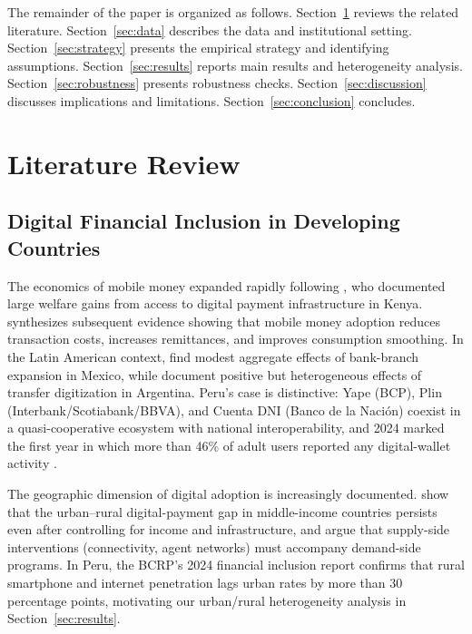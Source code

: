 \documentclass[12pt]{article}
\begin{document}
The remainder of the paper is organized as follows.
Section~\ref{sec:literature} reviews the related literature.
Section~\ref{sec:data} describes the data and institutional setting.
Section~\ref{sec:strategy} presents the empirical strategy and identifying
assumptions.
Section~\ref{sec:results} reports main results and heterogeneity analysis.
Section~\ref{sec:robustness} presents robustness checks.
Section~\ref{sec:discussion} discusses implications and limitations.
Section~\ref{sec:conclusion} concludes.


\section{Literature Review}
\label{sec:literature}

\subsection{Digital Financial Inclusion in Developing Countries}

The economics of mobile money expanded rapidly following \citet{jack2014},
who documented large welfare gains from access to digital payment
infrastructure in Kenya. \citet{suri2017} synthesizes subsequent evidence
showing that mobile money adoption reduces transaction costs, increases
remittances, and improves consumption smoothing. In the Latin American
context, \citet{bruhn2014} find modest aggregate effects of bank-branch
expansion in Mexico, while \citet{galiani2020} document positive but
heterogeneous effects of transfer digitization in Argentina. Peru's case is
distinctive: Yape (BCP), Plin (Interbank/Scotiabank/BBVA), and Cuenta DNI
(Banco de la Naci\'on) coexist in a quasi-cooperative ecosystem with
national interoperability, and 2024 marked the first year in which more
than 46\% of adult users reported any digital-wallet activity
\citep{bcrp2024report}.

The geographic dimension of digital adoption is increasingly documented.
\citet{bis2024} show that the urban--rural digital-payment gap in
middle-income countries persists even after controlling for income and
infrastructure, and argue that supply-side interventions (connectivity,
agent networks) must accompany demand-side programs. In Peru, the BCRP's
2024 financial inclusion report confirms that rural smartphone and internet
penetration lags urban rates by more than 30 percentage points, motivating
our urban/rural heterogeneity analysis in Section~\ref{sec:results}.
\end{document}
